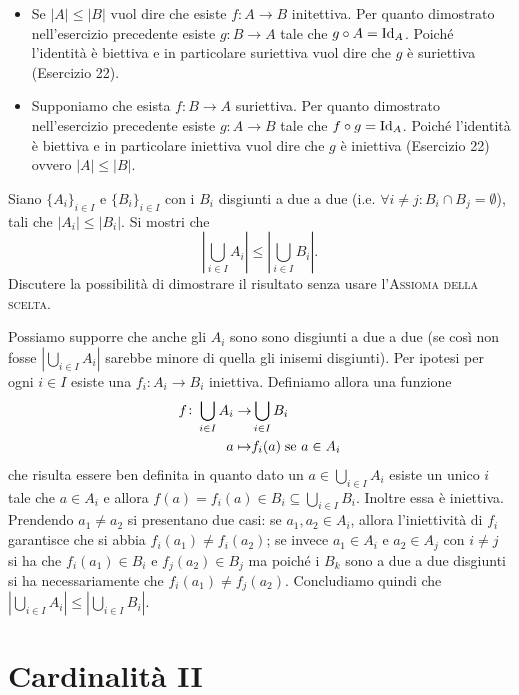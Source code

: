 \documentclass[a4paper]{article}\par \usepackage{style}\par
\begin{document}
\begin{itemize}[label = $ \Rightarrow $]
\item Se $ |A| \leq |B| $ vuol dire che esiste $ f \colon A \to B $ initettiva. Per quanto dimostrato nell'esercizio precedente esiste $ g \colon B \to A $ tale che $ g \circ A = \mathrm{Id}_A $. Poiché l'identità è biettiva e in particolare suriettiva vuol dire che $ g $ è suriettiva (Esercizio 22).
\end{itemize}
\begin{itemize}[label = $ \Leftarrow $]
\item Supponiamo che esista $ f \colon B \to A $ suriettiva. Per quanto dimostrato nell'esercizio precedente esiste $ g \colon A \to B $ tale che $ f \circ g = \mathrm{Id}_A $. Poiché l'identità è biettiva e in particolare iniettiva vuol dire che $ g $ è iniettiva (Esercizio 22) ovvero $ |A| \leq |B| $.
\end{itemize}\par \begin{es}
  Siano $ \{A_i\}_{i \in I} $ e $ \{B_i\}_{i \in I} $ con i $ B_i $ disgiunti a due a due (i.e. $ \forall i \neq j : B_i \cap B_j = \emptyset $), tali che $ |A_i| \leq |B_i| $. Si mostri che \[\left|\bigcup_{i \in I} A_i\right| \leq \left|\bigcup_{i \in I} B_i\right|.\] Discutere la possibilità di dimostrare il risultato senza usare l'\textsc{Assioma della scelta}.
\end{es}
Possiamo supporre che anche gli $ A_i $ sono sono disgiunti a due a due (se così non fosse $ \left|\bigcup_{i \in I} A_i\right| $ sarebbe minore di quella gli inisemi disgiunti). Per ipotesi per ogni $ i \in I $ esiste una $ f_i \colon A_i \to B_i $ iniettiva. Definiamo allora una funzione
\begin{align*}
  f \colon \bigcup_{i \in I} A_i \to & \bigcup_{i \in I} B_i \\
  a \mapsto & f_i(a) \; \text{se $ a \in A_i $}
\end{align*}
che risulta essere ben definita in quanto dato un $ a \in \bigcup_{i \in I} A_i $ esiste un unico $ i $ tale che $ a \in A_i $ e allora $ f(a) = f_i(a) \in B_i \subseteq \bigcup_{i \in I} B_i $. Inoltre essa è iniettiva. Prendendo $ a_1 \neq a_2 $ si presentano due casi: se $ a_1, a_2 \in A_i $, allora l'iniettività di $ f_i $ garantisce che si abbia $ f_i(a_1) \neq f_i(a_2) $; se invece $ a_1 \in A_i $ e $ a_2 \in A_j $ con $ i \neq j $ si ha che $ f_i(a_1) \in B_i $ e $ f_j(a_2) \in B_j $ ma poiché i $ B_k $ sono a due a due disgiunti si ha necessariamente che $ f_i(a_1) \neq f_j(a_2) $. Concludiamo quindi che $ \left|\bigcup_{i \in I} A_i\right| \leq \left|\bigcup_{i \in I} B_i\right| $.\par \section{Cardinalità II}
\end{document}
